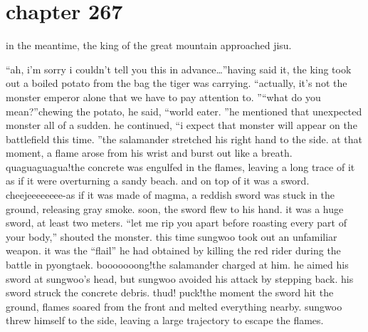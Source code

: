 \section{chapter 267}

                            in the meantime, the king of the great mountain approached jisu.





“ah, i’m sorry i couldn’t tell you this in advance…”having said it, the king took out a boiled potato from the bag the tiger was carrying.
“actually, it’s not the monster emperor alone that we have to pay attention to.
”“what do you mean?”chewing the potato, he said, “world eater.
”he mentioned that unexpected monster all of a sudden.
he continued, “i expect that monster will appear on the battlefield this time.
”the salamander stretched his right hand to the side.
 at that moment, a flame arose from his wrist and burst out like a breath.
quaguaguagua!the concrete was engulfed in the flames, leaving a long trace of it as if it were overturning a sandy beach.
 and on top of it was a sword.
cheejeeeeeeee-as if it was made of magma, a reddish sword was stuck in the ground, releasing gray smoke.
soon, the sword flew to his hand.
 it was a huge sword, at least two meters.
“let me rip you apart before roasting every part of your body,” shouted the monster.
this time sungwoo took out an unfamiliar weapon.
 it was the “flail” he had obtained by killing the red rider during the battle in pyongtaek.
booooooong!the salamander charged at him.
 he aimed his sword at sungwoo’s head, but sungwoo avoided his attack by stepping back.
 his sword struck the concrete debris.
thud! puck!the moment the sword hit the ground, flames soared from the front and melted everything nearby.
 sungwoo threw himself to the side, leaving a large trajectory to escape the flames.

